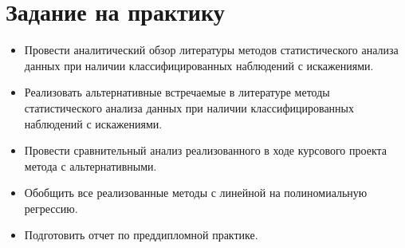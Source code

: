 \section*{Задание на практику}
{}
\begin{itemize}
    \item Провести аналитический обзор литературы методов статистического анализа данных при наличии классифицированных наблюдений с искажениями.
    \item Реализовать альтернативные встречаемые в литературе методы статистического анализа данных при наличии классифицированных наблюдений с искажениями.
    \item Провести сравнительный анализ реализованного в ходе курсового проекта метода с альтернативными.
    \item Обобщить все реализованные методы с линейной на полиномиальную регрессию.
    \item Подготовить отчет по преддипломной практике.
\end{itemize}